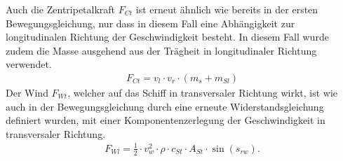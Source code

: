 \documentclass[]{iat}
\begin{document}
Auch die Zentripetalkraft $F_{Ct}$ ist erneut ähnlich wie bereits in der ersten Bewegungsgleichung, nur dass in diesem Fall eine Abhängigkeit zur longitudinalen Richtung der Geschwindigkeit besteht. In diesem Fall wurde zudem die Masse ausgehend aus der Trägheit in longitudinaler Richtung verwendet.
\begin{align}
    F_{Ct} = v_l \cdot v_r \cdot (m_{s}+ m_{Sl})
\end{align}
Der Wind $F_{Wt}$, welcher auf das Schiff in transversaler Richtung wirkt, ist wie auch in der Bewegungsgleichung durch eine erneute Widerstandsgleichung definiert wurden, mit einer Komponentenzerlegung der Geschwindigkeit in transversaler Richtung.
\begin{align}
    F_{Wl} = \frac{1}{2} \cdot v_w^2 \cdot \rho \cdot c_{St} \cdot A_{St} \cdot \sin(s_{rw}). \label{eq:wind_wt}
\end{align}
\end{document}
